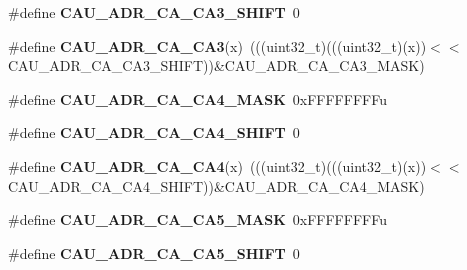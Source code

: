 \begin{DoxyCompactItemize}
\item 
\#define {\bfseries C\+A\+U\+\_\+\+A\+D\+R\+\_\+\+C\+A\+\_\+\+C\+A3\+\_\+\+S\+H\+I\+FT}~0\hypertarget{group__CAU__Register__Masks_ga93cb8cfd1a5fb49e223ca89c7c821ab5}{}\label{group__CAU__Register__Masks_ga93cb8cfd1a5fb49e223ca89c7c821ab5}

\item 
\#define {\bfseries C\+A\+U\+\_\+\+A\+D\+R\+\_\+\+C\+A\+\_\+\+C\+A3}(x)~(((uint32\+\_\+t)(((uint32\+\_\+t)(x))$<$$<$C\+A\+U\+\_\+\+A\+D\+R\+\_\+\+C\+A\+\_\+\+C\+A3\+\_\+\+S\+H\+I\+FT))\&C\+A\+U\+\_\+\+A\+D\+R\+\_\+\+C\+A\+\_\+\+C\+A3\+\_\+\+M\+A\+SK)\hypertarget{group__CAU__Register__Masks_gacbf10f24a67b200c72e1b7101efa6f6b}{}\label{group__CAU__Register__Masks_gacbf10f24a67b200c72e1b7101efa6f6b}

\item 
\#define {\bfseries C\+A\+U\+\_\+\+A\+D\+R\+\_\+\+C\+A\+\_\+\+C\+A4\+\_\+\+M\+A\+SK}~0x\+F\+F\+F\+F\+F\+F\+F\+Fu\hypertarget{group__CAU__Register__Masks_ga2ed9f31c68a09dba5db3b3e10836f3e6}{}\label{group__CAU__Register__Masks_ga2ed9f31c68a09dba5db3b3e10836f3e6}

\item 
\#define {\bfseries C\+A\+U\+\_\+\+A\+D\+R\+\_\+\+C\+A\+\_\+\+C\+A4\+\_\+\+S\+H\+I\+FT}~0\hypertarget{group__CAU__Register__Masks_gacd7b74188dccfc62f26f78229fb8a766}{}\label{group__CAU__Register__Masks_gacd7b74188dccfc62f26f78229fb8a766}

\item 
\#define {\bfseries C\+A\+U\+\_\+\+A\+D\+R\+\_\+\+C\+A\+\_\+\+C\+A4}(x)~(((uint32\+\_\+t)(((uint32\+\_\+t)(x))$<$$<$C\+A\+U\+\_\+\+A\+D\+R\+\_\+\+C\+A\+\_\+\+C\+A4\+\_\+\+S\+H\+I\+FT))\&C\+A\+U\+\_\+\+A\+D\+R\+\_\+\+C\+A\+\_\+\+C\+A4\+\_\+\+M\+A\+SK)\hypertarget{group__CAU__Register__Masks_gad525508bdc2b57937df37b9ae1d49017}{}\label{group__CAU__Register__Masks_gad525508bdc2b57937df37b9ae1d49017}

\item 
\#define {\bfseries C\+A\+U\+\_\+\+A\+D\+R\+\_\+\+C\+A\+\_\+\+C\+A5\+\_\+\+M\+A\+SK}~0x\+F\+F\+F\+F\+F\+F\+F\+Fu\hypertarget{group__CAU__Register__Masks_ga75b64822c5faed17c8032081d5ba9de7}{}\label{group__CAU__Register__Masks_ga75b64822c5faed17c8032081d5ba9de7}

\item 
\#define {\bfseries C\+A\+U\+\_\+\+A\+D\+R\+\_\+\+C\+A\+\_\+\+C\+A5\+\_\+\+S\+H\+I\+FT}~0\hypertarget{group__CAU__Register__Masks_ga172ed7376ee2f81527fc39ed02ac8925}{}\label{group__CAU__Register__Masks_ga172ed7376ee2f81527fc39ed02ac8925}


\end{DoxyCompactItemize}
